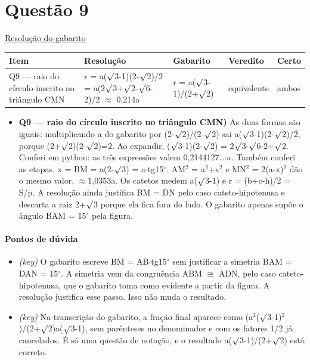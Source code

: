 \documentclass{article}%
\begin{document}
\section*{Questão 9}%
\href{https://poliedroresolve.sistemapoliedro.com.br/vestibulares/ime/2026/ime-2-fase-dia-1-23-10-2025-2-fase-dia-1/dissertativa-9-matematica-2-fase-dia-1-ime-2026}{Resolução do gabarito}\par\smallskip%
\begin{longtable}{@{}p{} p{} p{} p{} p{}@{}}\toprule Item & Resolução & Gabarito & Veredito & Certo \\ \midrule
Q9 --- raio do círculo inscrito no triângulo CMN & r = a($\surd$3-1)(2-$\surd$2)/2 = a(2$\surd$3+$\surd$2-$\surd$6-2)/2 $\approx$ 0,214a & r = a($\surd$3-1)/(2+$\surd$2) & equivalente & ambos \\
\bottomrule\end{longtable}%
\begin{itemize}%
\item%
\textbf{Q9 --- raio do círculo inscrito no triângulo CMN)} As duas formas são iguais: multiplicando a do gabarito por (2-$\surd$2)/(2-$\surd$2) sai a($\surd$3-1)(2-$\surd$2)/2, porque (2+$\surd$2)(2-$\surd$2)=2. Ao expandir, ($\surd$3-1)(2-$\surd$2) = 2$\surd$3-$\surd$6-2+$\surd$2. Conferi em python: as três expressões valem 0,2144127\ldots{}$\cdot$a. Também conferi as etapas. x = BM = a(2-$\surd$3) = a$\cdot$tg15$^\circ$. AM$^2$ = a$^2$+x$^2$ e MN$^2$ = 2(a-x)$^2$ dão o mesmo valor, $\approx$1,0353a. Os catetos medem a($\surd$3-1) e r = (b+c-h)/2 = S/p. A resolução ainda justifica BM = DN pelo caso cateto{-}hipotenusa e descarta a raiz 2+$\surd$3 porque ela fica fora do lado. O gabarito apenas supõe o ângulo BAM = 15$^\circ$ pela figura.%
\end{itemize}%
\paragraph{Pontos de dúvida}%
\begin{itemize}%
\item%
\textit{(key)} O gabarito escreve BM = AB$\cdot$tg15$^\circ$ sem justificar a simetria BAM = DAN = 15$^\circ$. A simetria vem da congruência ABM $\cong$ ADN, pelo caso cateto{-}hipotenusa, que o gabarito toma como evidente a partir da figura. A resolução justifica esse passo. Isso não muda o resultado.%
\item%
\textit{(key)} Na transcrição do gabarito, a fração final aparece como (a$^2$($\surd$3-1)$^2$)/(2+$\surd$2)a($\surd$3-1), sem parênteses no denominador e com os fatores 1/2 já cancelados. É só uma questão de notação, e o resultado a($\surd$3-1)/(2+$\surd$2) está correto.%
\end{itemize}%
\end{document}

